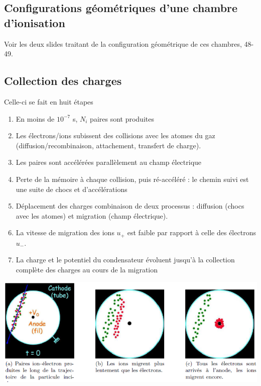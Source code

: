 	\subsection{Configurations géométriques d'une chambre d'ionisation}
	Voir les deux slides traitant
	de la configuration géométrique de ces chambres, 48-49.

	\newpage		
	\subsection{Collection des charges}
	Celle-ci se fait en huit étapes
	\begin{enumerate}
	\item En moins de $10^{-7}$ s, $N_i$ paires sont produites
	\item Les électrons/ions subissent des collisions avec les atomes du gaz (diffusion/recombinaison, 
	attachement, transfert de charge).
	\item Les paires sont accélérées parallèlement au champ électrique
	\item Perte de la mémoire à chaque collision, puis ré-accéléré : le chemin suivi est une suite de
	chocs et d'accélérations
	\item Déplacement des charges combinaison de deux processus : diffusion (chocs avec les atomes)
	et migration (champ électrique).
	\item La vitesse de migration des ions $u_+$ est faible par rapport à celle des électrons $u_-$.
	\item La charge et le potentiel du condensateur évoluent jusqu'à la collection complète des
	charges au cours de la migration
	\end{enumerate}		

	\begin{center}
	\includegraphics[scale=0.45]{ch8/image3}
	\end{center}	
	
